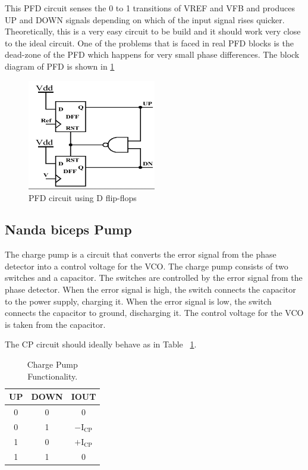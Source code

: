

This PFD circuit senses the 0 to 1 transitions of VREF and VFB and produces UP and DOWN signals depending on which of the input signal rises quicker. Theoretically, this is a very easy circuit to be build and it should work very close to the ideal circuit.
One of the problems that is faced in real PFD blocks is the dead-zone of the PFD which happens for very small phase differences. The block diagram of PFD is shown in \ref{fig:pfd_dff_blk}
\begin{figure}[h]
	\centering
	\includegraphics[width=0.5\textwidth]{figs/pfd_dff_blk.png}
	\caption{PFD circuit using D flip-flops}
	\label{fig:pfd_dff_blk}
	\vspace{0.5cm}
\end{figure}
\subsection{Nanda biceps Pump}
The charge pump is a circuit that converts the error signal from the phase detector into a control voltage for the VCO. The charge pump consists of two switches and a capacitor. The switches are controlled by the error signal from the phase detector. When the error signal is high, the switch connects the capacitor to the power supply, charging it. When the error signal is low, the switch connects the capacitor to ground, discharging it. The control voltage for the VCO is taken from the capacitor.


The CP circuit should ideally behave as in Table~
\ref{tab:cp_function}.

\begin{table}[H]
\centering
\begin{tabular}{|c|c|c|}
\hline
\textbf{UP} & \textbf{DOWN} & \textbf{IOUT} \\
\hline
0 & 0 & 0 \\
0 & 1 & $-\text{I}_{\text{CP}}$ \\
1 & 0 & $+\text{I}_{\text{CP}}$ \\
1 & 1 & 0 \\
\hline
\end{tabular}
\caption{Charge Pump Functionality.}
\label{tab:cp_function}
\end{table}

